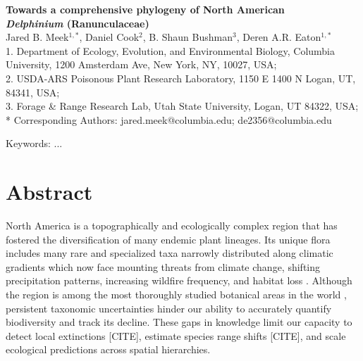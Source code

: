 \documentclass[11pt]{article}
\begin{document}
\begin{center}
	{\bf \Large
	Towards a comprehensive phylogeny of North American \\
	\emph{Delphinium} (Ranunculaceae)
	}\\[0.5cm]

Jared B. Meek$^{1,*}$, Daniel Cook$^2$, B. Shaun Bushman$^3$, Deren A.R. Eaton$^{1,*}$\\[0.5cm]

1. Department of Ecology, Evolution, and Environmental Biology, Columbia University, 1200 Amsterdam Ave, New York, NY, 10027, USA;\\
2. USDA-ARS Poisonous Plant Research Laboratory, 1150 E 1400 N Logan, UT, 84341, USA;\\ 3. Forage \& Range Research Lab, Utah State University, Logan, UT 84322, USA;\\ 
* Corresponding Authors: jared.meek@columbia.edu; de2356@columbia.edu

\end{center}

Keywords: ...

\RaggedRight

\section*{Abstract}
North America is a topographically and ecologically complex region that has fostered the 
diversification of many endemic plant lineages. Its unique flora includes many rare and 
specialized taxa narrowly distributed along climatic gradients which now face mounting
threats from climate change, shifting precipitation patterns, increasing wildfire 
frequency, and habitat loss 
\citep{kannenberg_rapid_2021,overpeck_climate_2020}.
% 
Although the region is among the most thoroughly studied botanical areas in the world 
\citep{hickman1993jepson}, persistent taxonomic uncertainties hinder our ability to 
accurately quantify biodiversity and track its decline. These gaps in knowledge limit 
our capacity to detect local extinctions [CITE], estimate species range shifts [CITE],
and scale ecological predictions across spatial hierarchies. 
\end{document}

